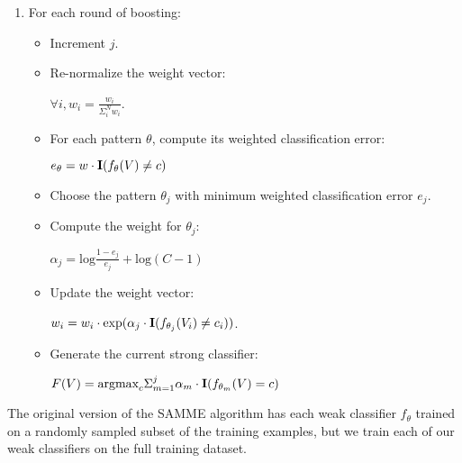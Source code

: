\documentclass[10pt,twocolumn,letterpaper]{article}
\begin{document}
\begin{enumerate}
				\item For each round of boosting:
					\begin{itemize}
						\item Increment $j$.
						\item Re-normalize the weight vector:
              \begin{center}
              $\forall i, w_i = \frac{w_i}{\Sigma_i^N w_i}$.
              \end{center}
					  \item For each pattern $\theta$,
              compute its weighted classification error:
              \begin{center}
              $e_\theta = w \cdot \mbox{\textbf{I}}(f_\theta(V) \neq c)$
              \end{center}
						\item Choose the pattern $\theta_j$ with minimum weighted
              classification error $e_j$.
						\item Compute the weight for $\theta_j$:
              \begin{center}
              $\alpha_j = \mbox{log} \frac{1 - e_j}{e_j} + \mbox{log}(C-1)$
              \end{center}
						\item Update the weight vector:
              \begin{center}
							$w_i = w_i \cdot \mbox{exp}(\alpha_j \cdot
							\mbox{\textbf{I}}(f_{\theta_j}(V_i) \neq c_i))$.
              \end{center}
						\item Generate the current strong classifier:
              \begin{center}
							$F(V) = \mbox{argmax}_c \Sigma_{m=1}^j \alpha_m \cdot
							\mbox{\textbf{I}}(f_{\theta_m}(V) = c)$
              \end{center}
					\end{itemize}

			\end{enumerate}
	
	The original version of the SAMME algorithm has each weak classifier
	$f_\theta$ trained on
	a randomly sampled subset of the training examples, but we train each of
	our weak classifiers on the full training dataset.
\end{document}
